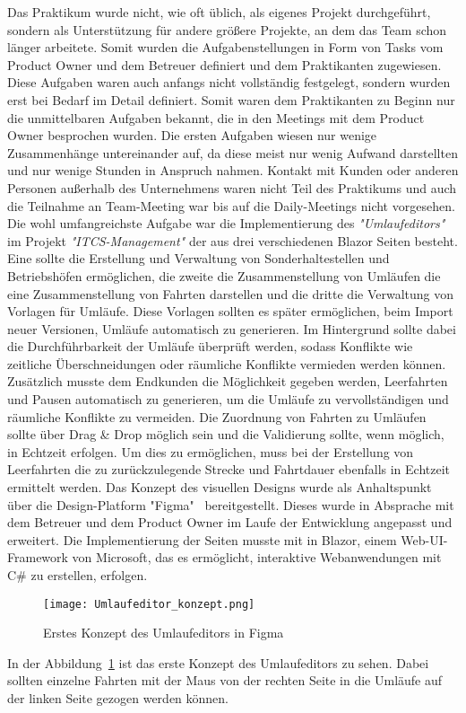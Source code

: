     Das Praktikum wurde nicht, wie oft üblich, als eigenes Projekt durchgeführt, sondern als
    Unterstützung für andere größere Projekte, an dem das Team schon länger arbeitete. Somit wurden die Aufgabenstellungen in Form von Tasks vom Product Owner und dem Betreuer definiert 
    und dem Praktikanten zugewiesen. Diese Aufgaben waren auch anfangs nicht vollständig festgelegt, sondern wurden erst bei Bedarf im Detail definiert. Somit waren dem Praktikanten zu Beginn
    nur die unmittelbaren Aufgaben bekannt, die in den Meetings mit dem Product Owner besprochen wurden.
    Die ersten Aufgaben wiesen nur wenige Zusammenhänge untereinander auf, da diese meist nur wenig Aufwand darstellten und nur wenige Stunden in Anspruch nahmen. 
    Kontakt mit Kunden oder anderen Personen außerhalb des Unternehmens waren nicht Teil des Praktikums und auch die Teilnahme an Team-Meeting war bis auf die Daily-Meetings nicht vorgesehen.
    Die wohl umfangreichste Aufgabe war die Implementierung des  \emph{"Umlaufeditors"} im Projekt \emph{"ITCS-Management"} der aus drei verschiedenen Blazor Seiten besteht. Eine sollte die Erstellung 
    und Verwaltung von Sonderhaltestellen und Betriebshöfen ermöglichen, die zweite die Zusammenstellung von Umläufen die eine Zusammenstellung von Fahrten darstellen und 
    die dritte die Verwaltung von Vorlagen für Umläufe. Diese Vorlagen sollten es später ermöglichen, beim Import neuer Versionen, Umläufe automatisch zu generieren. Im Hintergrund sollte dabei
    die Durchführbarkeit der Umläufe überprüft werden, sodass Konflikte wie zeitliche Überschneidungen oder räumliche Konflikte vermieden werden können. Zusätzlich musste dem 
    Endkunden die Möglichkeit gegeben werden, Leerfahrten und Pausen automatisch zu generieren, um die Umläufe zu vervollständigen und räumliche Konflikte zu vermeiden. Die Zuordnung 
    von Fahrten zu Umläufen sollte über Drag \& Drop möglich sein und die Validierung sollte, wenn möglich, in Echtzeit erfolgen. Um dies zu ermöglichen, muss bei der Erstellung von Leerfahrten die zu 
    zurückzulegende Strecke und Fahrtdauer ebenfalls in Echtzeit ermittelt werden.
    Das Konzept des visuellen Designs wurde als Anhaltspunkt über die Design-Platform "Figma"~\cite{figma} bereitgestellt. Dieses wurde in Absprache mit dem Betreuer und dem 
    Product Owner im Laufe der Entwicklung
    angepasst und erweitert. Die Implementierung der Seiten musste mit in Blazor, einem Web-UI-Framework von Microsoft, das es ermöglicht, interaktive Webanwendungen mit C\# zu erstellen, erfolgen.
    
    \begin{figure}[H]
        \centering
        \texttt{[image: Umlaufeditor\_konzept.png]}
        \caption{Erstes Konzept des Umlaufeditors in Figma}
        \label{fig:Umlaufeditor_konzept}
    \end{figure}

    In der Abbildung~\ref{fig:Umlaufeditor_konzept} ist das erste Konzept des Umlaufeditors zu sehen. Dabei sollten einzelne Fahrten mit der Maus von der rechten Seite in die Umläufe auf der linken Seite
    gezogen werden können.
